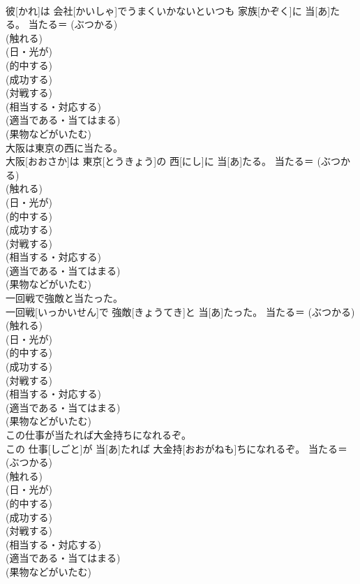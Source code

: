 \documentclass[8pt]{extreport}
\begin{document}
\begin{CJK}{UTF8}{min}
{\\	彼[かれ]は 会社[かいしゃ]でうまくいかないといつも 家族[かぞく]に 当[あ]たる。	当たる＝ (ぶつかる) 
\\	(触れる) 
\\	(日・光が) 
\\	(的中する) 
\\	(成功する) 
\\	(対戦する) 
\\	(相当する・対応する) 
\\	(適当である・当てはまる) 
\\	(果物などがいたむ)
\\	大阪は東京の西に当たる。	
\\	大阪[おおさか]は 東京[とうきょう]の 西[にし]に 当[あ]たる。	当たる＝ (ぶつかる) 
\\	(触れる) 
\\	(日・光が) 
\\	(的中する) 
\\	(成功する) 
\\	(対戦する) 
\\	(相当する・対応する) 
\\	(適当である・当てはまる) 
\\	(果物などがいたむ)
\\	一回戦で強敵と当たった。	
\\	一回戦[いっかいせん]で 強敵[きょうてき]と 当[あ]たった。	当たる＝ (ぶつかる) 
\\	(触れる) 
\\	(日・光が) 
\\	(的中する) 
\\	(成功する) 
\\	(対戦する) 
\\	(相当する・対応する) 
\\	(適当である・当てはまる) 
\\	(果物などがいたむ)
\\	この仕事が当たれば大金持ちになれるぞ。	
\\	この 仕事[しごと]が 当[あ]たれば 大金持[おおがねも]ちになれるぞ。	当たる＝ (ぶつかる) 
\\	(触れる) 
\\	(日・光が) 
\\	(的中する) 
\\	(成功する) 
\\	(対戦する) 
\\	(相当する・対応する) 
\\	(適当である・当てはまる) 
\\	(果物などがいたむ)
}
\end{CJK}
\end{document}
